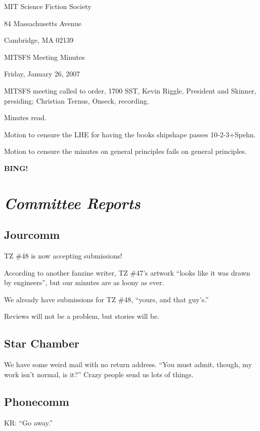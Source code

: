 \documentclass[10pt]{article}
\newcommand{\bing}{{\bf BING!} }
\newcommand{\goto}[1]{\bing \vskip 12pt \section*{{\em{#1}}}}
\begin{document}
\begin{center}

MIT Science Fiction Society

84 Massachusetts Avenue

Cambridge, MA 02139

\vspace{12pt}

MITSFS Meeting Minutes

Friday, January 26, 2007

\end{center}

\vspace{18pt}

\setlength{\parskip}{6pt}

\noindent
MITSFS meeting called to order, 1700 SST,
Kevin Riggle, President and Skinner, presiding; Christian Ternus, Onseck, recording.

Minutes read.

Motion to censure the LHE for having the books shipshape passes 10-2-3+Spehn.

Motion to censure the minutes on general principles fails on general principles.

\goto{Committee Reports}

\subsection*{Jourcomm}
TZ \#48 is now accepting submissions!

According to another fanzine writer, TZ \#47's artwork ``looks like it was drawn by engineers'', but our minutes are as loony as ever.

We already have submissions for TZ \#48, ``yours, and that guy's.''

Reviews will not be a problem, but stories will be.

\subsection*{Star Chamber}

We have some weird mail with no return address.  ``You must admit, though, my work isn't normal, is it?''  Crazy people send us lots of things.

\subsection*{Phonecomm}
KR: ``Go away.''
\end{document}
